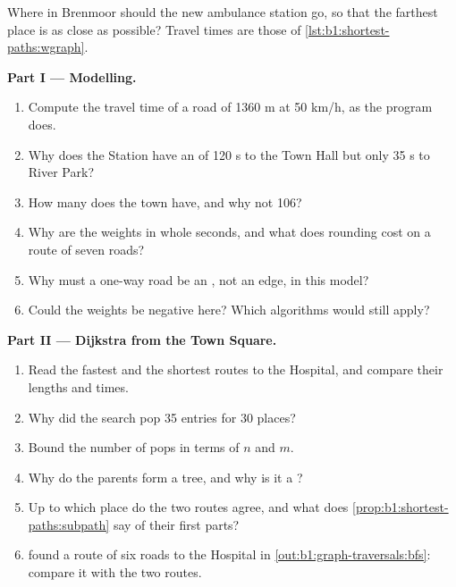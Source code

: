 \begin{problem}\label{pb:b1:shortest-paths:1}
Where in Brenmoor should the new ambulance station go, so that the farthest place is as close as possible? Travel times
are those of \cref{lst:b1:shortest-paths:wgraph}.
\label{lst:b1:shortest-paths:centre}
\label{out:b1:shortest-paths:centre}

\medskip\noindent\textbf{Part I --- Modelling.}
\begin{enumerate}
\item Compute the travel time of a road of 1360 m at 50 km/h, as the program does.
\item Why does the Station have an  of 120 s to the Town Hall but only 35 s to River Park?
\item How many  does the town have, and why not 106?
\item Why are the weights in whole seconds, and what does rounding cost on a route of seven roads?
\item Why must a one-way road be an , not an edge, in this model?
\item Could the weights be negative here? Which algorithms would still apply?
\end{enumerate}

\medskip\noindent\textbf{Part II --- Dijkstra from the Town Square.}
\begin{enumerate}[resume]
\item Read the fastest and the shortest routes to the Hospital, and compare their lengths and times.
\item Why did the search pop 35 entries for 30 places?
\item Bound the number of pops in terms of $n$ and $m$.
\item Why do the parents form a tree, and why is it a ?
\item Up to which place do the two routes agree, and what does \cref{prop:b1:shortest-paths:subpath} say of their first parts?
\item {} found a route of six roads to the Hospital in \cref{out:b1:graph-traversals:bfs}: compare it with the two routes.
\end{enumerate}


\end{problem}
